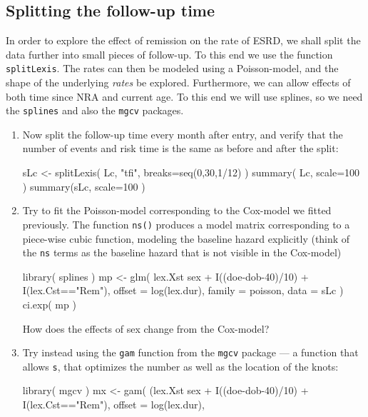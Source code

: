 \subsection{Splitting the follow-up time}
In order to explore the effect of remission on the rate of ESRD, we
shall split the data further into small pieces of follow-up. To this
end we use the function \texttt{splitLexis}. The rates can then be
modeled using a Poisson-model, and the shape of the underlying
\emph{rates} be explored. Furthermore, we can allow effects of both
time since NRA and current age. To this end we will use splines, so we
need the \texttt{splines} and also the \texttt{mgcv} packages.
\begin{enumerate}[resume]
\item Now split the follow-up time every month after entry, and verify
  that the number of events and risk time is the same as before and
  after the split:
\begin{Schunk}
\begin{Sinput}
 sLc <- splitLexis( Lc, "tfi", breaks=seq(0,30,1/12) )
 summary( Lc, scale=100 )
 summary(sLc, scale=100 )
\end{Sinput}
\end{Schunk}
\item Try to fit the Poisson-model corresponding to the Cox-model
  we fitted previously. The function \texttt{ns()} produces a model
  matrix corresponding to a piece-wise cubic function, modeling the
  baseline hazard explicitly (think of the \texttt{ns} terms as the
  baseline hazard that is not visible in the Cox-model)
\begin{Schunk}
\begin{Sinput}
 library( splines )
 mp <- glm( lex.Xst %in% EP ~ ns( tfi, df=4 ) +
            sex + I((doe-dob-40)/10) + I(lex.Cst=="Rem"),
            offset = log(lex.dur),
            family = poisson, 
              data = sLc )
 ci.exp( mp )
\end{Sinput}
\end{Schunk}
How does the effects of sex change from the Cox-model?
\item Try instead using the \texttt{gam} function from the
  \texttt{mgcv} package --- a function that allows \texttt{s}, that
  optimizes the number as well as the location of the knots:
\begin{Schunk}
\begin{Sinput}
 library( mgcv )
 mx <- gam( (lex.Xst %in% EP) ~ s( tfi, k=10 ) +
            sex + I((doe-dob-40)/10) + I(lex.Cst=="Rem"),
            offset = log(lex.dur),

\end{Sinput}
\end{Schunk}
\end{enumerate}
